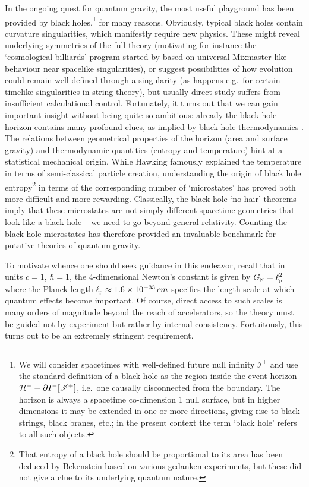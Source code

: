 \documentclass[12pt]{article}
\def\GR{general relativity}
\def\QG{quantum gravity}
\def\GN{G_{\scriptscriptstyle {\rm N}}}
\def\lpl{\ell_{\scriptscriptstyle {\rm p}}}
\def\scri{\mathscr I}
\begin{document}
In the ongoing quest for \QG, the most useful playground has been provided by black holes,\footnote{
We will consider spacetimes with well-defined future null infinity $\scri^+$ and use the standard definition of a black hole as the region inside the event horizon ${\cal H}^+ \equiv \partial I^-[\scri^+]$, i.e.\ one causally disconnected from the boundary.  The horizon is always a spacetime co-dimension 1 null surface, but in higher dimensions it may be extended in one or more directions, giving rise to black strings, black branes, etc.;  in the present context the term `black hole' refers to all such objects.
} for many reasons.  Obviously, typical black holes contain curvature singularities, which manifestly require new physics.  These might reveal underlying symmetries of the full theory 
(motivating for instance the `cosmological billiards' program started by \cite{belinskii1982general} based on universal Mixmaster-like behaviour near spacelike singularities), or suggest possibilities of how evolution could remain well-defined through a singularity (as happens  e.g.\ for certain timelike singularities in string theory),
but usually direct study suffers from insufficient calculational control.
Fortunately,
it turns out that we can gain important insight without being quite so ambitious: already the black hole horizon contains many profound clues,  as implied by black hole thermodynamics \cite{Wald:1999vt}.  The relations between geometrical properties of the horizon (area and surface gravity) and thermodynamic quantities (entropy and temperature)  hint at a statistical mechanical origin. 
While Hawking \cite{hawking1975particle} famously explained the temperature in terms of semi-classical particle creation, understanding the origin of black hole entropy\footnote{
That entropy of a black hole should be proportional to its area has been  deduced by Bekenstein \cite{bekenstein1973black} based on various gedanken-experiments, but these did not give a clue to its underlying quantum nature.
}
 in terms of the corresponding number of  `microstates' has proved both more difficult and more rewarding.  Classically, the black hole `no-hair' theorems  imply that these microstates are not simply different  spacetime geometries that look like a black hole -- we need to go beyond \GR.
 Counting the black hole microstates has therefore provided an invaluable benchmark for putative theories of \QG.

To motivate whence one should seek guidance in this endeavor, recall that
in  units $c=1$, $\hbar =1$, the 4-dimensional Newton's constant is given by $\GN = \lpl^2$ where the Planck length $\lpl \approx 1.6 \times 10^{-33} \, cm$ specifies the length scale at which quantum effects become important. 
 Of course, direct access to such scales  is many orders of magnitude beyond the reach of accelerators, so the theory must be guided not by experiment but rather by internal consistency.  Fortuitously, this turns out to be an extremely stringent requirement.
\end{document}
